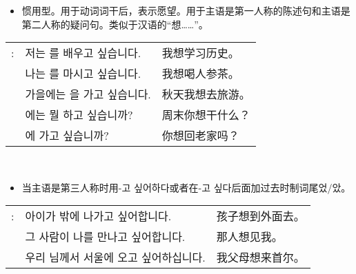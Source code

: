 \begin{grammar}
\begin{grammarsect}[\kr -고 싶다]
\begin{itemize}
            \item 惯用型。用于动词词干后，表示愿望。用于主语是第一人称的陈述句和主语是第二人称的疑问句。类似于汉语的“想……”。
        \end{itemize}
        \begin{tabular}{lll}
            \kr \ruby{例}{예}: &\kr 저는 \ruby{歷史}{역사}를 배우고 싶습니다.&我想学习历史。\\
            &\kr 나는 \ruby{人蔘茶}{인삼차}를 마시고 싶습니다.&我想喝人参茶。\\
            &\kr 가을에는 \ruby{旅行}{여행}을 가고 싶습니다.&秋天我想去旅游。\\
            &\kr \ruby{週末}{주말}에는 뭘 하고 싶습니까?&周末你想干什么？\\
            &\kr \ruby{故鄉}{고향}에 가고 싶습니까?&你想回老家吗？
        \end{tabular}\\
        \begin{itemize}
            \item 当主语是第三人称时用{\kr -고 싶어하다}或者在{\kr -고 싶다}后面加过去时制词尾{\kr 었/았}。
        \end{itemize}
        \begin{tabular}{lll}
            \kr \ruby{例}{예}: &\kr 아이가 밖에 나가고 싶어합니다. &孩子想到外面去。\\
            &\kr 그 사람이 나를 만나고 싶어합니다. &那人想见我。\\
            &\kr 우리 \ruby{父母}{부모}님께서 서울에 오고 싶어하십니다.&我父母想来首尔。
        \end{tabular}\\
    \end{grammarsect}
\end{grammar}
